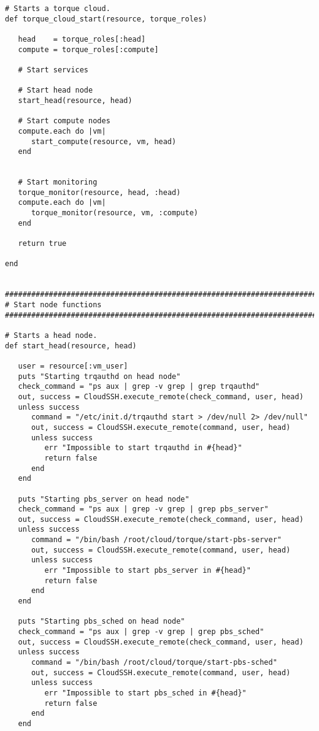 \begin{lstlisting}
# Starts a torque cloud.
def torque_cloud_start(resource, torque_roles)

   head    = torque_roles[:head]
   compute = torque_roles[:compute]

   # Start services
   
   # Start head node
   start_head(resource, head)
   
   # Start compute nodes
   compute.each do |vm|
      start_compute(resource, vm, head)
   end
   
   
   # Start monitoring
   torque_monitor(resource, head, :head)
   compute.each do |vm|
      torque_monitor(resource, vm, :compute)
   end
   
   return true
   
end


################################################################################
# Start node functions
################################################################################

# Starts a head node.
def start_head(resource, head)
   
   user = resource[:vm_user]
   puts "Starting trqauthd on head node"
   check_command = "ps aux | grep -v grep | grep trqauthd"
   out, success = CloudSSH.execute_remote(check_command, user, head)
   unless success
      command = "/etc/init.d/trqauthd start > /dev/null 2> /dev/null"
      out, success = CloudSSH.execute_remote(command, user, head)
      unless success
         err "Impossible to start trqauthd in #{head}"
         return false
      end
   end
   
   puts "Starting pbs_server on head node"
   check_command = "ps aux | grep -v grep | grep pbs_server"
   out, success = CloudSSH.execute_remote(check_command, user, head)
   unless success
      command = "/bin/bash /root/cloud/torque/start-pbs-server"
      out, success = CloudSSH.execute_remote(command, user, head)
      unless success
         err "Impossible to start pbs_server in #{head}"
         return false
      end
   end
   
   puts "Starting pbs_sched on head node"
   check_command = "ps aux | grep -v grep | grep pbs_sched"
   out, success = CloudSSH.execute_remote(check_command, user, head)
   unless success
      command = "/bin/bash /root/cloud/torque/start-pbs-sched"
      out, success = CloudSSH.execute_remote(command, user, head)
      unless success
         err "Impossible to start pbs_sched in #{head}"
         return false
      end
   end


\end{lstlisting}
